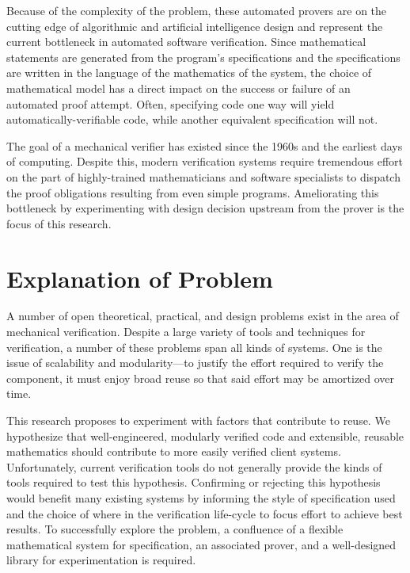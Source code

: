 \documentclass[10pt]{ClemsonProposal}
\begin{document}
Because of the complexity of the problem, these automated provers are on the cutting edge of algorithmic and artificial intelligence design and represent the current bottleneck in automated software verification.  Since mathematical statements are generated from the program's specifications and the specifications are written in the language of the mathematics of the system, the choice of mathematical model has a direct impact on the success or failure of an automated proof attempt.  Often, specifying code one way will yield automatically-verifiable code, while another equivalent specification will not.

The goal of a mechanical verifier has existed since the 1960s and the earliest days of computing\cite{hoareAxiomaticProgramming}.  Despite this, modern verification systems require tremendous effort on the part of highly-trained mathematicians and software specialists to dispatch the proof obligations resulting from even simple programs.  Ameliorating this bottleneck by experimenting with design decision upstream from the prover is the focus of this research.

\pagebreak
\flushbottom
\section*{Explanation of Problem}
A number of open theoretical, practical, and design problems exist in the area of mechanical verification.  Despite a large variety of tools and techniques for verification, a number of these problems span all kinds of systems.  One is the issue of scalability and modularity---to justify the effort required to verify the component, it must enjoy broad reuse so that said effort may be amortized over time.

This research proposes to experiment with factors that contribute to reuse.  We hypothesize that well-engineered, modularly verified code and extensible, reusable mathematics should contribute to more easily verified client systems.  Unfortunately, current verification tools do not generally provide the kinds of tools required to test this hypothesis.  Confirming or rejecting this hypothesis would benefit many existing systems by informing the style of specification used and the choice of where in the verification life-cycle to focus effort to achieve best results.  To successfully explore the problem, a confluence of a flexible mathematical system for specification, an associated prover, and a well-designed library for experimentation is required.
\end{document}
